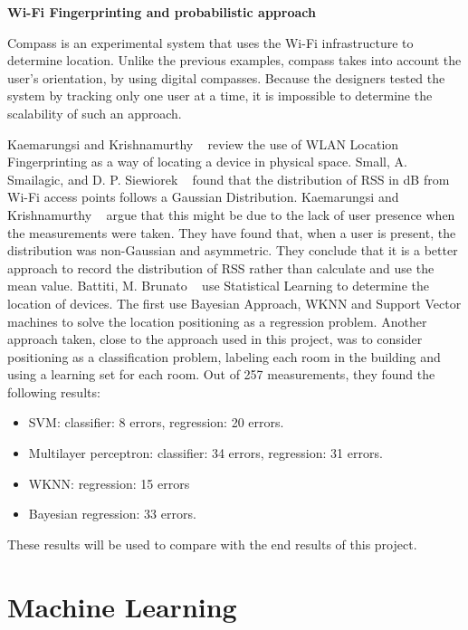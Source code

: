 \medskip
\noindent \textbf{Wi-Fi Fingerprinting and probabilistic approach}

Compass \cite{King} is an experimental system that uses the Wi-Fi infrastructure to determine location. Unlike the previous examples, compass takes into account the user’s orientation, by using digital compasses. Because the designers tested the system by tracking only one user at a time, it is impossible to determine the scalability of such an approach.

Kaemarungsi and Krishnamurthy ~\cite{Kaemarungsi} review the use of WLAN Location Fingerprinting as a way of locating a device in physical space. Small, A. Smailagic, and D. P. Siewiorek ~\cite{Small} found that the distribution of RSS in dB from Wi-Fi access points follows a Gaussian Distribution. Kaemarungsi and Krishnamurthy ~\cite{Kaemarungsi} argue that this might be due to the lack of user presence when the measurements were taken. They have found that, when a user is present, the distribution was non-Gaussian and asymmetric. They conclude that it is a better approach to record the distribution of RSS rather than calculate and use the mean value. 
Battiti, M. Brunato ~\cite{Battiti} use Statistical Learning to determine the location of devices. The first use Bayesian Approach, WKNN and Support Vector machines to solve the location positioning as a regression problem. Another approach taken, close to the approach used in this project, was to consider positioning as a classification problem, labeling each room in the building and using a learning set for each room. Out of 257 measurements, they found the following results:
\begin{itemize}
\item SVM: classifier: 8 errors, regression: 20 errors.
\item Multilayer perceptron: classifier: 34 errors, regression: 31 errors.
\item WKNN: regression: 15 errors
\item Bayesian regression: 33 errors.
\end{itemize}
These results will be used to compare with the end results of this project.

\section{Machine Learning}

